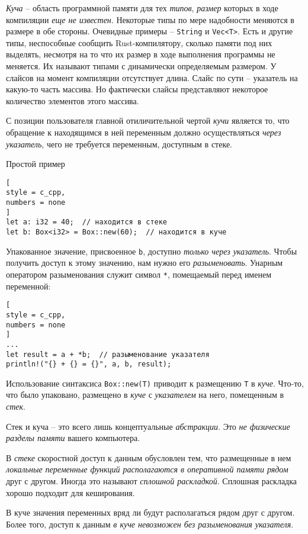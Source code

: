 \documentclass[%
	11pt,
	a4paper,
	utf8,
		]{article}
\begin{document}
\emph{Куча} -- область программной памяти для тех \emph{типов}, \emph{размер} которых в ходе компиляции \emph{еще не известен}. Некоторые типы по мере надобности меняются в размере в обе стороны. Очевидные примеры -- \verb|String| и \verb|Vec<T>|. Есть и другие типы, неспособные сообщить Rust-компилятору, сколько памяти под них выделять, несмотря на то что их размер в ходе выполнения программы не меняется. Их называют типами с динамически определяемым размером. У слайсов на момент компиляции отсутствует длина. Слайс по сути -- указатель на какую-то часть массива. Но фактически слайсы представляют некоторое количество элементов этого массива.

С позиции пользователя главной отиличительной чертой \emph{кучи} является то, что обращение к находящимся в ней переменным должно осуществляться \emph{через указатель}, чего не требуется переменным, доступным в стеке.

Простой пример
\begin{lstlisting}[
style = c_cpp,
numbers = none
]
let a: i32 = 40;  // находится в стеке
let b: Box<i32> = Box::new(60);  // находится в куче
\end{lstlisting}

Упакованное значение, присвоенное \verb|b|, доступно \emph{только через указатель}. Чтобы получить доступ к этому значению, нам нужно его \emph{разыменовать}. Унарным оператором разыменования служит символ \verb|*|, помещаемый перед именем переменной:
\begin{lstlisting}[
style = c_cpp,
numbers = none
]
...
let result = a + *b;  // разыменование указателя
println!("{} + {} = {}", a, b, result);
\end{lstlisting}

Использование синтаксиса \verb|Box::new(T)| приводит к размещению \verb|T| в \emph{куче}. Что-то, что было упаковано, размещено в \emph{куче} с \emph{указателем} на него, помещенным в \emph{стек}.

Стек и куча -- это всего лишь концептуальные \emph{абстракции}. Это \emph{не физические разделы памяти} вашего компьютера.

В \emph{стеке} скоростной доступ к данным обусловлен тем, что размещенные в нем \emph{локальные переменные функций располагаются в оперативной памяти рядом} друг с другом. Иногда это называют \emph{сплошной раскладкой}. Сплошная раскладка хорошо подходит для кеширования.

В куче значения переменных вряд ли будут располагаться рядом друг с другом. Более того, доступ к данным \emph{\color{red}в куче невозможен без разыменования указателя}.
\end{document}

